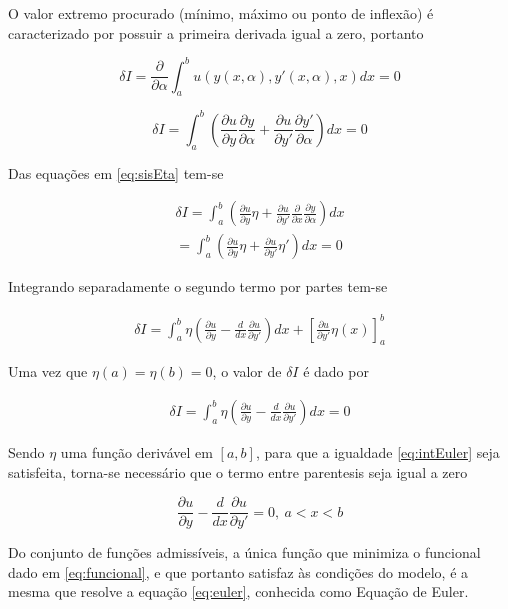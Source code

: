 O valor extremo procurado (mínimo, máximo ou ponto de inflexão) é caracterizado por possuir a primeira derivada igual a zero, portanto

\begin{equation}
\delta I = \frac{\partial}{\partial \alpha} \int_{a}^{b} u(y(x, \alpha), y'(x, \alpha), x) dx = 0
\end{equation}

\begin{equation}
\delta I = \int_{a}^{b} \left(\frac{\partial u}{\partial y} \frac{\partial y}{\partial \alpha} + \frac{\partial u}{\partial y'} \frac{\partial y'}{\partial \alpha}\right) dx = 0
\end{equation}

Das equações em \ref{eq:sisEta} tem-se 

\begin{equation}
\begin{split}
\delta I = \int_{a}^{b} \left(\frac{\partial u}{\partial y} \eta + \frac{\partial u}{\partial y'} \frac{\partial }{\partial x}
\frac{\partial y}{\partial \alpha}\right) dx \\
= \int_{a}^{b} \left(\frac{\partial u}{\partial y} \eta + \frac{\partial u}{\partial y'} \eta'
\right) dx = 0
\end{split}
\end{equation}

Integrando separadamente o segundo termo por partes tem-se

\begin{equation}
\begin{split}
\delta I = \int_{a}^{b} \eta \left(\frac{\partial u}{\partial y} - \frac{d}{dx} 
\frac{\partial u}{\partial y'}\right)  dx +
\left[\frac{\partial u}{\partial y'} \eta(x) \right]_a^b
\end{split}
\end{equation}

Uma vez que $\eta(a) = \eta(b) = 0$, o valor de $ \delta I $ é dado por

\begin{equation}
\label{eq:intEuler}
\begin{split}
\delta I = \int_{a}^{b} \eta \left(\frac{\partial u}{\partial y} - \frac{d}{dx} 
\frac{\partial u}{\partial y'}\right)  dx = 0
\end{split}
\end{equation}

Sendo $ \eta $ uma função derivável em $ [a,b] $, para que a igualdade \ref{eq:intEuler} seja satisfeita, torna-se necessário que o termo entre parentesis seja igual a zero

\begin{equation}
\label{eq:euler}
\frac{\partial u}{\partial y} - \frac{d}{dx} 
\frac{\partial u}{\partial y'} = 0, \ a < x < b
\end{equation}

Do conjunto de funções admissíveis, a única função que minimiza o funcional dado em \ref{eq:funcional}, e que portanto satisfaz às condições do modelo, é a mesma que resolve a equação \ref{eq:euler}, conhecida como Equação de Euler.
